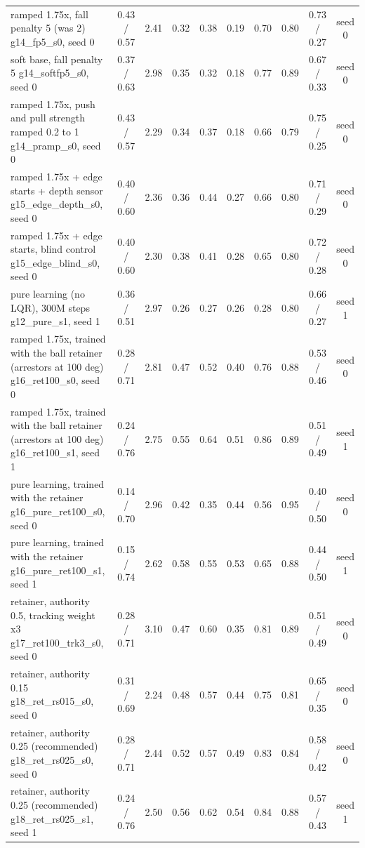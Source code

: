\begin{table}[t]
{\begin{tabular}{lccccccccc}
ramped 1.75x, fall penalty 5 (was 2) g14\_fp5\_s0, seed 0 & 0.43 / 0.57 & 2.41 & 0.32 & 0.38 & 0.19 & 0.70 & 0.80 & 0.73 / 0.27 & seed 0\\
soft base, fall penalty 5 g14\_softfp5\_s0, seed 0 & 0.37 / 0.63 & 2.98 & 0.35 & 0.32 & 0.18 & 0.77 & 0.89 & 0.67 / 0.33 & seed 0\\
ramped 1.75x, push and pull strength ramped 0.2 to 1 g14\_pramp\_s0, seed 0 & 0.43 / 0.57 & 2.29 & 0.34 & 0.37 & 0.18 & 0.66 & 0.79 & 0.75 / 0.25 & seed 0\\
ramped 1.75x + edge starts + depth sensor g15\_edge\_depth\_s0, seed 0 & 0.40 / 0.60 & 2.36 & 0.36 & 0.44 & 0.27 & 0.66 & 0.80 & 0.71 / 0.29 & seed 0\\
ramped 1.75x + edge starts, blind control g15\_edge\_blind\_s0, seed 0 & 0.40 / 0.60 & 2.30 & 0.38 & 0.41 & 0.28 & 0.65 & 0.80 & 0.72 / 0.28 & seed 0\\
pure learning (no LQR), 300M steps g12\_pure\_s1, seed 1 & 0.36 / 0.51 & 2.97 & 0.26 & 0.27 & 0.26 & 0.28 & 0.80 & 0.66 / 0.27 & seed 1\\
ramped 1.75x, trained with the ball retainer (arrestors at 100 deg) g16\_ret100\_s0, seed 0 & 0.28 / 0.71 & 2.81 & 0.47 & 0.52 & 0.40 & 0.76 & 0.88 & 0.53 / 0.46 & seed 0\\
ramped 1.75x, trained with the ball retainer (arrestors at 100 deg) g16\_ret100\_s1, seed 1 & 0.24 / 0.76 & 2.75 & 0.55 & 0.64 & 0.51 & 0.86 & 0.89 & 0.51 / 0.49 & seed 1\\
pure learning, trained with the retainer g16\_pure\_ret100\_s0, seed 0 & 0.14 / 0.70 & 2.96 & 0.42 & 0.35 & 0.44 & 0.56 & 0.95 & 0.40 / 0.50 & seed 0\\
pure learning, trained with the retainer g16\_pure\_ret100\_s1, seed 1 & 0.15 / 0.74 & 2.62 & 0.58 & 0.55 & 0.53 & 0.65 & 0.88 & 0.44 / 0.50 & seed 1\\
retainer, authority 0.5, tracking weight x3 g17\_ret100\_trk3\_s0, seed 0 & 0.28 / 0.71 & 3.10 & 0.47 & 0.60 & 0.35 & 0.81 & 0.89 & 0.51 / 0.49 & seed 0\\
retainer, authority 0.15 g18\_ret\_rs015\_s0, seed 0 & 0.31 / 0.69 & 2.24 & 0.48 & 0.57 & 0.44 & 0.75 & 0.81 & 0.65 / 0.35 & seed 0\\
retainer, authority 0.25 (recommended) g18\_ret\_rs025\_s0, seed 0 & 0.28 / 0.71 & 2.44 & 0.52 & 0.57 & 0.49 & 0.83 & 0.84 & 0.58 / 0.42 & seed 0\\
retainer, authority 0.25 (recommended) g18\_ret\_rs025\_s1, seed 1 & 0.24 / 0.76 & 2.50 & 0.56 & 0.62 & 0.54 & 0.84 & 0.88 & 0.57 / 0.43 & seed 1\\

\end{tabular}}
\end{table}
